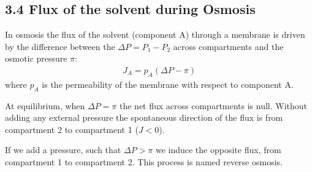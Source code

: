 \documentclass[letterpaper,10pt,english]{jupyterBook}
\begin{document}
\subsection{3.4 Flux of the solvent during Osmosis}
\label{\detokenize{Osmosis:flux-of-the-solvent-during-osmosis}}
\sphinxAtStartPar
In osmosis the flux of the solvent (component A) through a membrane is driven by the difference between the \(\Delta{P}=P_1-P_2\) across compartments and the osmotic pressure \(\pi\):
\begin{equation}\label{equation:Osmosis:OSMeq9}
\begin{split}
J_A=p_A\left( \Delta{P} - \pi \right)
\end{split}
\end{equation}
\sphinxAtStartPar
where \(p_A\) is the permeability of the membrane with respect to component A.

\sphinxAtStartPar
At equilibrium, when \(\Delta{P}=\pi\) the net flux across compartments is null. Without adding any external pressure the spontaneous direction of the flux is from compartment 2 to compartment 1 (\(J<0\)).

\sphinxAtStartPar
If we add a pressure, such that \(\Delta{P}>\pi\) we induce the opposite flux, from compartment 1 to compartment 2. This process is named reverse osmosis.
\end{document}
